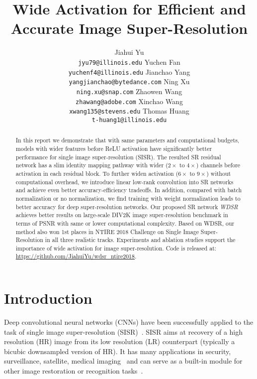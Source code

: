 \documentclass{article}
\title{Wide Activation for Efficient and Accurate Image Super-Resolution}
\author{
  Jiahui Yu\\
  \texttt{jyu79@illinois.edu}
  \And
  Yuchen Fan\\
  \texttt{yuchenf4@illinois.edu}
  \And
  Jianchao Yang\\
  \texttt{yangjianchao@bytedance.com}
  \And
  Ning Xu\\
  \texttt{ning.xu@snap.com}
  \And
  Zhaowen Wang\\
  \texttt{zhawang@adobe.com}
  \And
  Xinchao Wang\\
  \texttt{xwang135@stevens.edu}
  \And
  Thomas Huang\\
  \texttt{t-huang1@illinois.edu}
}
\begin{document}
\maketitle
\begin{abstract}
In this report we demonstrate that with same parameters and computational budgets, models with wider features before ReLU activation have significantly better performance for single image super-resolution (SISR). The resulted SR residual network has a slim identity mapping pathway with wider (\(2\times\) to \(4\times\)) channels before activation in each residual block. To further widen activation (\(6\times\) to \(9\times\)) without computational overhead, we introduce linear low-rank convolution into SR networks and achieve even better accuracy-efficiency tradeoffs. In addition, compared with batch normalization or no normalization, we find training with weight normalization leads to better accuracy for deep super-resolution networks. Our proposed SR network \textit{WDSR} achieves better results on large-scale DIV2K image super-resolution benchmark in terms of PSNR with same or lower computational complexity. Based on WDSR, our method also won 1st places in NTIRE 2018 Challenge on Single Image Super-Resolution in all three realistic tracks. Experiments and ablation studies support the importance of wide activation for image super-resolution. Code is released at: \url{https://github.com/JiahuiYu/wdsr_ntire2018}.
\end{abstract}

\section{Introduction}

Deep convolutional neural networks (CNNs) have been successfully applied to the task of single image super-resolution (SISR)~\cite{kim2016accurate, lim2017enhanced, liu2016robust, 2018arXiv180208797Z}. SISR aims at recovery of a high resolution (HR) image from its low resolution (LR) counterpart (typically a bicubic downsampled version of HR). It has many applications in security, surveillance, satellite, medical imaging~\cite{peled2001superresolution, thornton2006sub} and can serve as a built-in module for other image restoration or recognition tasks~\cite{fan2018wide, liu2017robust, wang2016studying, yu2018free, yu2018generative}.
 
\end{document}

